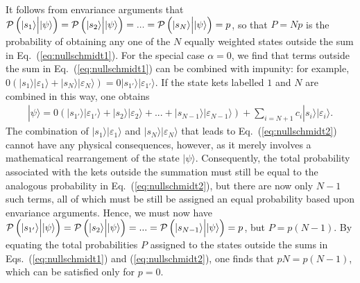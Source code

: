 \documentclass[12pt]{iopart}
\begin{document}
It follows from envariance arguments that ${\cal P}\left(|s_1\rangle \Big{|} |\psi\rangle\right)={\cal P}\left(|s_2\rangle \Big{|} |\psi\rangle\right)=...={\cal P}\left(|s_N\rangle \Big{|} |\psi\rangle\right)=p$, so that $P=Np$ is the probability of obtaining any one of the $N$ equally weighted states outside the sum in Eq.~(\ref{eq:nullschmidt1}). For the special case $\alpha=0$, we find that terms outside the sum in Eq.~(\ref{eq:nullschmidt1}) can be combined with impunity: for example, $0\left(|s_1\rangle|\varepsilon_1\rangle + |s_N\rangle|\varepsilon_N\rangle\right) = 0|s_{1'}\rangle|\varepsilon_{1'}\rangle$. If the state kets labelled $1$ and $N$ are combined in this way, one obtains
%
\begin{eqnarray}\label{eq:nullschmidt2}
	|\psi\rangle=0\left(|s_{1'}\rangle|\varepsilon_{1'}\rangle + |s_2\rangle|\varepsilon_2\rangle + ... + |s_{N-1}\rangle|\varepsilon_{N-1}\rangle \right)+ \sum_{i=N+1}c_i |s_i\rangle|\varepsilon_i\rangle.
\end{eqnarray}
%
The combination of $|s_1\rangle|\varepsilon_1\rangle$ and $|s_N\rangle|\varepsilon_N\rangle$ that leads to Eq.~(\ref{eq:nullschmidt2}) cannot have any physical consequences, however, as it merely involves a mathematical rearrangement of the state $|\psi\rangle$. Consequently, the total probability associated with the kets outside the summation must still be equal to the analogous probability in Eq.~(\ref{eq:nullschmidt2}), but there are now only $N-1$ such terms, all of which must be still be assigned an equal probability based upon envariance arguments. Hence, we must now have ${\cal P}\left(|s_{1'}\rangle \Big{|} |\psi\rangle\right)={\cal P}\left(|s_2\rangle \Big{|} |\psi\rangle\right)=...={\cal P}\left(|s_{N-1}\rangle \Big{|} |\psi\rangle\right)=p$, but $P=p(N-1)$. By equating the total probabilities $P$ assigned to the states outside the sums in Eqs.~(\ref{eq:nullschmidt1}) and (\ref{eq:nullschmidt2}), one finds that $pN=p(N-1)$, which can be satisfied only for $p=0$.
%
\end{document}
